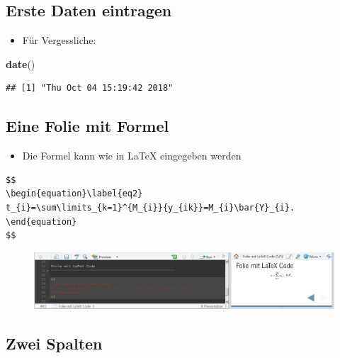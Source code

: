 \documentclass[]{article}
\newenvironment{Shaded}{\begin{snugshade}}{\end{snugshade}}
\newcommand{\KeywordTok}[1]{\textcolor[rgb]{0.13,0.29,0.53}{\textbf{#1}}}
\newcommand{\NormalTok}[1]{#1}
\providecommand{\tightlist}{%
  \setlength{\itemsep}{0pt}\setlength{\parskip}{0pt}}
\begin{document}
\subsection{Erste Daten eintragen}\label{erste-daten-eintragen}

\begin{itemize}
\tightlist
\item
  Für Vergessliche:
\end{itemize}

\begin{Shaded}
\begin{Highlighting}[]
\KeywordTok{date}\NormalTok{()}
\end{Highlighting}
\end{Shaded}

\begin{verbatim}
## [1] "Thu Oct 04 15:19:42 2018"
\end{verbatim}

\subsection{Eine Folie mit Formel}\label{eine-folie-mit-formel}

\begin{itemize}
\tightlist
\item
  Die Formel kann wie in LaTeX eingegeben werden
\end{itemize}

\begin{verbatim}
$$
\begin{equation}\label{eq2}
t_{i}=\sum\limits_{k=1}^{M_{i}}{y_{ik}}=M_{i}\bar{Y}_{i}. 
\end{equation}
$$
\end{verbatim}

\begin{figure}
\centering
\includegraphics{figure/FolieLatexCode.PNG}
\caption{}
\end{figure}

\subsection{Zwei Spalten}\label{zwei-spalten}
\end{document}
